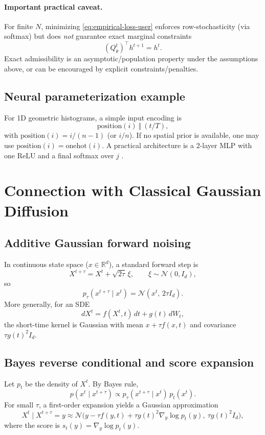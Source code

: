 \documentclass[11pt]{article}
\begin{document}
\paragraph{Important practical caveat.}
For finite $N$, minimizing \eqref{eq:empirical-loss-user} enforces row-stochasticity (via softmax) but does \emph{not} guarantee exact marginal constraints
\[
(Q_\theta^t)^\top h^{t+1}=h^t.
\]
Exact admissibility is an asymptotic/population property under the assumptions above, or can be encouraged by explicit constraints/penalties.

\subsection{Neural parameterization example}
For 1D geometric histograms, a simple input encoding is
\[
\mathrm{position}(i)\ \Vert\ (t/T),
\]
with $\mathrm{position}(i)=i/(n-1)$ (or $i/n$). If no spatial prior is available, one may use $\mathrm{position}(i)=\mathrm{onehot}(i)$.
A practical architecture is a 2-layer MLP with one ReLU and a final softmax over $j$
\citep{austin2021structured,campbell2022continuous,bach2025binary,pauline2025foundations}.


\section{Connection with Classical Gaussian Diffusion}
\subsection{Additive Gaussian forward noising}
In continuous state space ($x\in\mathbb R^d$), a standard forward step is
\[
X^{t+\tau}=X^t+\sqrt{2\tau}\,\xi,\qquad \xi\sim\mathcal N(0,I_d),
\]
so
\[
p_\tau(x^{t+\tau}\mid x^t)=\mathcal N(x^t,\,2\tau I_d).
\]
More generally, for an SDE
\[
dX^t=f(X^t,t)\,dt+g(t)\,dW_t,
\]
the short-time kernel is Gaussian with mean $x+\tau f(x,t)$ and covariance $\tau g(t)^2 I_d$.

\subsection{Bayes reverse conditional and score expansion}
Let $p_t$ be the density of $X^t$. By Bayes rule,
\[
p(x^t\mid x^{t+\tau})
\propto
p_\tau(x^{t+\tau}\mid x^t)\,p_t(x^t).
\]
For small $\tau$, a first-order expansion yields a Gaussian approximation
\[
X^t\mid X^{t+\tau}=y
\approx
\mathcal N\!\Big(y-\tau f(y,t)+\tau g(t)^2\nabla_y\log p_t(y),\ \tau g(t)^2 I_d\Big),
\]
where the score is $s_t(y)=\nabla_y\log p_t(y)$.
\end{document}

